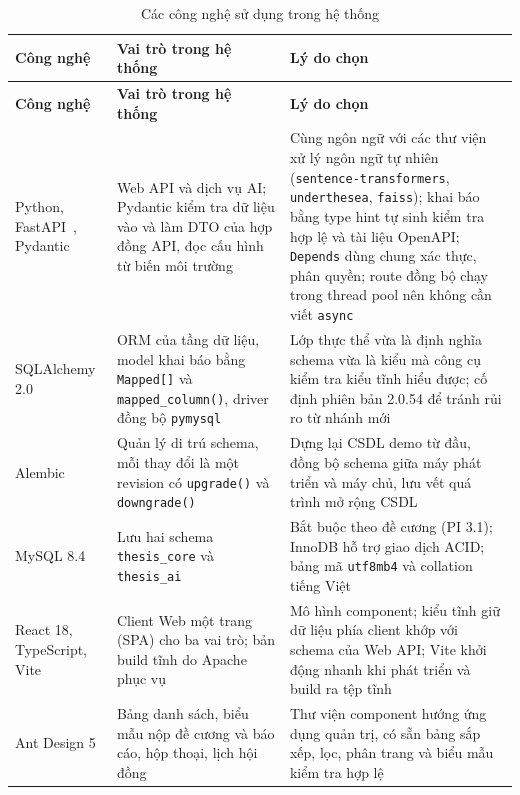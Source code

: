 \documentclass[../main.tex]{subfiles}
\begin{document}
{\renewcommand{\arraystretch}{1.2}
\begin{longtable}{|>{\raggedright\arraybackslash}p{2.9cm}|>{\raggedright\arraybackslash}p{5.2cm}|>{\raggedright\arraybackslash}p{6.2cm}|}
\caption{Các công nghệ sử dụng trong hệ thống}\label{tab:c1-cong-nghe}\\
\hline
\textbf{Công nghệ} & \textbf{Vai trò trong hệ thống} & \textbf{Lý do chọn} \\
\hline
\endfirsthead
\hline
\textbf{Công nghệ} & \textbf{Vai trò trong hệ thống} & \textbf{Lý do chọn} \\
\hline
\endhead
Python, FastAPI~\cite{fastapi}, Pydantic~\cite{pydantic} & Web API và dịch vụ AI; Pydantic kiểm tra dữ liệu vào và làm DTO của hợp đồng API, đọc cấu hình từ biến môi trường & Cùng ngôn ngữ với các thư viện xử lý ngôn ngữ tự nhiên (\texttt{sentence-transformers}, \texttt{underthesea}, \texttt{faiss}); khai báo bằng type hint tự sinh kiểm tra hợp lệ và tài liệu OpenAPI; \texttt{Depends} dùng chung xác thực, phân quyền; route đồng bộ chạy trong thread pool nên không cần viết \texttt{async} \\
\hline
SQLAlchemy 2.0~\cite{sqlalchemy} & ORM của tầng dữ liệu, model khai báo bằng \texttt{Mapped[]} và \texttt{mapped\_column()}, driver đồng bộ \texttt{pymysql} & Lớp thực thể vừa là định nghĩa schema vừa là kiểu mà công cụ kiểm tra kiểu tĩnh hiểu được; cố định phiên bản 2.0.54 để tránh rủi ro từ nhánh mới \\
\hline
Alembic~\cite{alembic} & Quản lý di trú schema, mỗi thay đổi là một revision có \texttt{upgrade()} và \texttt{downgrade()} & Dựng lại CSDL demo từ đầu, đồng bộ schema giữa máy phát triển và máy chủ, lưu vết quá trình mở rộng CSDL \\
\hline
MySQL 8.4~\cite{mysqlutf8mb4} & Lưu hai schema \texttt{thesis\_core} và \texttt{thesis\_ai} & Bắt buộc theo đề cương (PI 3.1); InnoDB hỗ trợ giao dịch ACID; bảng mã \texttt{utf8mb4} và collation tiếng Việt \\
\hline
React 18, TypeScript, Vite~\cite{react,typescript,vite} & Client Web một trang (SPA) cho ba vai trò; bản build tĩnh do Apache phục vụ & Mô hình component; kiểu tĩnh giữ dữ liệu phía client khớp với schema của Web API; Vite khởi động nhanh khi phát triển và build ra tệp tĩnh \\
\hline
Ant Design 5~\cite{antd} & Bảng danh sách, biểu mẫu nộp đề cương và báo cáo, hộp thoại, lịch hội đồng & Thư viện component hướng ứng dụng quản trị, có sẵn bảng sắp xếp, lọc, phân trang và biểu mẫu kiểm tra hợp lệ \\

\end{longtable}}
\end{document}
